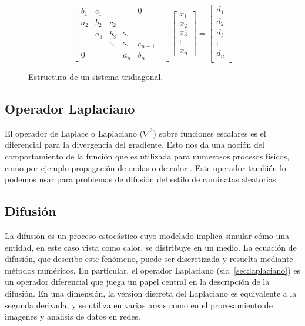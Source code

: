\begin{figure}[h]

    \[ \begin{bmatrix}
b_1 & c_1 & & & 0\\
a_2 & b_2 & c_2 & & & \\
    & a_3 & b_3 & \ddots & \\
    &    & \ddots &  \ddots&c_{n-1}\\
0   &    &   & a_n & b_n
     \end{bmatrix}
  \begin{bmatrix}
        x_{1}\\
        x_{2} \\
        x_{3}\\ 
        \vdots\\ 
        x_{n}  
 \end{bmatrix}
 =
 \begin{bmatrix}
     d_{1} \\
     d_{2} \\
     d_{3} \\
     \vdots \\
     d_{n} \\
 \end{bmatrix}
 \]
 
 \caption{Estructura de un sistema tridiagonal.}
 \label{fig:tridiagonal}
\end{figure}

\subsection{Operador Laplaciano}
\label{Intro_laplaciano}
\label{sec:laplaciano}

El operador de Laplace o Laplaciano ($\nabla^{2}$) sobre funciones escalares es el diferencial para la divergencia del gradiente. Esto nos da una noción del comportamiento de la función que es utilizada para numerosos procesos físicos, como por ejemplo propagación de ondas o de calor \cite{laplaciano_web}. Este operador también lo podemos usar para problemas de difusión del estilo de caminatas aleatorias \cite{random_walk}

\subsection{Difusión}
\label{Intro_difusion}

 La difusión es un proceso estocástico cuyo modelado implica simular cómo una entidad, en este caso vista como calor, se distribuye en un medio. La ecuación de difusión, que describe este fenómeno, puede ser discretizada y resuelta mediante métodos numéricos. En particular, el operador Laplaciano (sic. \ref{sec:laplaciano}) es un operador diferencial que juega un papel central en la descripción de la difusión. En una dimensión, la versión discreta del Laplaciano es equivalente a la segunda derivada, y se utiliza en varias areas como en el procesamiento de imágenes y análisis de datos en redes.


